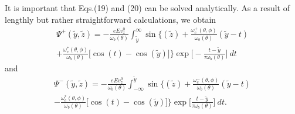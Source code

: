 \documentclass[prl,aps,showpacs,twocolumn,floatfix]{revtex4}
\begin{document}
It is important that Eqs.(19) and (20) can be solved analytically.
As a result of lengthly but rather straightforward calculations,
we obtain
\begin{eqnarray}
\Psi^+(\tilde y, \tilde z) = -\frac{e E v^0_z}{\omega_b (\theta)}
\int^{\infty}_{\tilde y} \sin \biggl\{ (\tilde z) +
\frac{\omega^+_c(\theta,\phi)}{\omega_b (\theta)}(\tilde y -t)
\nonumber\\
+ \frac{\omega^*_c(\theta,\phi)}{\omega_b (\theta)} \biggl[
\cos(t)-\cos(\tilde y) \biggl] \biggl\} \exp \biggl[-\frac{t-
\tilde y}{\tau \omega_b (\theta)} \biggl] \ dt
\end{eqnarray}
and
\begin{eqnarray}
\Psi^-(\tilde y, \tilde z) = -\frac{e E v^0_z}{\omega_b (\theta)}
\int^{\tilde y}_{-\infty} \sin \biggl\{(\tilde z) +
\frac{\omega^-_c(\theta,\phi)}{\omega_b (\theta)}(\tilde y -t)
\nonumber\\
- \frac{\omega^*_c(\theta,\phi)}{\omega_b (\theta)} \biggl[
\cos(t)-\cos(\tilde y) \biggl] \biggl\} \exp \biggl[\frac{t-
\tilde y}{\tau \omega_b (\theta)} \biggl] \ dt.
\end{eqnarray}
\end{document}
